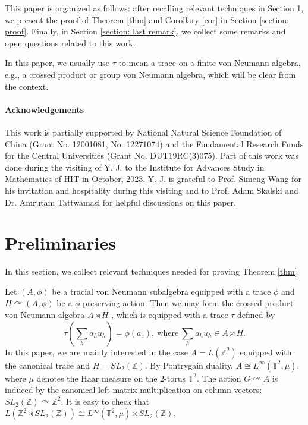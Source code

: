 \documentclass[12pt]{amsart}
\theoremstyle{definition}
\theoremstyle{remark}
\begin{document}
This paper is organized as follows: after recalling  relevant techniques in Section \ref{section: preliminaries}, we present the proof of Theorem \ref{thm} and Corollary \ref{cor} in Section \ref{section: proof}. Finally, in Section \ref{section: last remark}, we collect some remarks and open questions related to this work. 

In this paper, we usually use $\tau$ to mean a trace on a finite von Neumann algebra, e.g., a crossed product or group von Neumann algebra, which will be clear from the context.
\medskip

\paragraph{\textbf{Acknowledgements}} 

This work is partially supported by National Natural Science Foundation of China (Grant No. 12001081, No. 12271074) and the Fundamental Research Funds for the Central Universities (Grant No. DUT19RC(3)075). Part of this work was done during the visiting of Y. J. to the Institute for Advances Study in Mathematics of HIT in October, 2023. Y. J. is grateful to Prof. Simeng Wang for his invitation and hospitality during this visiting and to Prof. Adam Skalski and Dr. Amrutam Tattwamasi for helpful discussions on this paper.

\section{Preliminaries}\label{section: preliminaries}

In this section, we collect relevant techniques needed for proving Theorem \ref{thm}.

Let $(A,\phi)$ be a tracial von Neumann subalgebra equipped with a trace $\phi$ and $H\curvearrowright (A,\phi)$ be a $\phi$-preserving action. Then we may form the crossed product von Neumann algebra $A\rtimes H$ \cite[\S~5.2]{ap}, which is equipped with a trace $\tau$ defined by 
\[\tau(\sum_ha_hu_h)=\phi(a_e),~\text{where}~ \sum_ha_hu_h\in A\rtimes H.\]
In this paper, we are mainly interested in the case $A=L(\mathbb{Z}^2)$ equipped with the canonical trace and $H=SL_2(\mathbb{Z})$. By Pontrygain duality, $A\cong L^{\infty}(\mathbb{T}^2,\mu)$, where $\mu$ denotes the Haar measure on the 2-torus $\mathbb{T}^2$. The action $G\curvearrowright A$ is induced by the canonical left matrix multiplication on column vectors: $SL_2(\mathbb{Z})\curvearrowright \mathbb{Z}^2$. It is easy to check that $L(\mathbb{Z}^2\rtimes SL_2(\mathbb{Z}))\cong L^{\infty}(\mathbb{T}^2,\mu)\rtimes SL_2(\mathbb{Z})$.  
\end{document}
